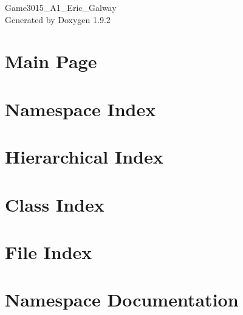 \documentclass[twoside]{book}
\newcommand{\+}{\discretionary{\mbox{\scriptsize$\hookleftarrow$}}{}{}}
\newcommand{\clearemptydoublepage}{%
    \newpage{\pagestyle{empty}\cleardoublepage}%
  }
\begin{document}
  \raggedbottom
    \hypersetup{pageanchor=false,
                bookmarksnumbered=true,
                pdfencoding=unicode
               }
  \begin{titlepage}
  \vspace*{7cm}
  \begin{center}%
  {\Large Game3015\+\_\+\+A1\+\_\+\+Eric\+\_\+\+Galway}\\
  \vspace*{1cm}
  {\large Generated by Doxygen 1.9.2}\\
  \end{center}
  \end{titlepage}
  \clearemptydoublepage
  \tableofcontents
  \clearemptydoublepage
  \hypersetup{pageanchor=true}
\chapter{Main Page}
\label{index}\hypertarget{index}{}
\chapter{Namespace Index}

\chapter{Hierarchical Index}

\chapter{Class Index}

\chapter{File Index}

\chapter{Namespace Documentation}



\end{document}
